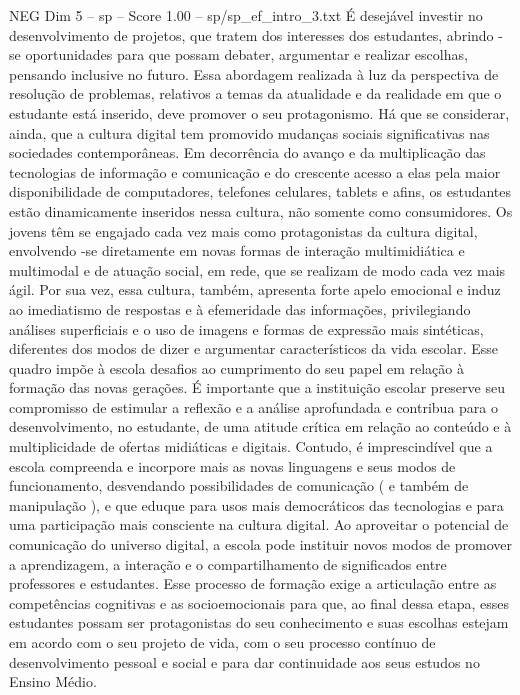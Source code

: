 \begin{textsample}{NEG Dim 5 – sp – Score 1.00 – sp/sp\_ef\_intro\_3.txt}
É desejável investir no desenvolvimento de projetos, que tratem dos interesses dos estudantes, abrindo -se oportunidades para que possam debater, argumentar e realizar escolhas, pensando inclusive no futuro.
Essa abordagem realizada à luz da perspectiva de resolução de problemas, relativos a temas da atualidade e da realidade em que o estudante está inserido, deve promover o seu protagonismo.
Há que se considerar, ainda, que a cultura digital tem promovido mudanças sociais significativas nas sociedades contemporâneas.
Em decorrência do avanço e da multiplicação das tecnologias de informação e comunicação e do crescente acesso a elas pela maior disponibilidade de computadores, telefones celulares, tablets e afins, os estudantes estão dinamicamente inseridos nessa cultura, não somente como consumidores.
Os jovens têm se engajado cada vez mais como protagonistas da cultura digital, envolvendo -se diretamente em novas formas de interação multimidiática e multimodal e de atuação social, em rede, que se realizam de modo cada vez mais ágil.
Por sua vez, essa cultura, também, apresenta forte apelo emocional e induz ao imediatismo de respostas e à efemeridade das informações, privilegiando análises superficiais e o uso de imagens e formas de expressão mais sintéticas, diferentes dos modos de dizer e argumentar característicos da vida escolar.
Esse quadro impõe à escola desafios ao cumprimento do seu papel em relação à formação das novas gerações.
É importante que a instituição escolar preserve seu compromisso de estimular a reflexão e a análise aprofundada e contribua para o desenvolvimento, no estudante, de uma atitude crítica em relação ao conteúdo e à multiplicidade de ofertas midiáticas e digitais.
Contudo, é imprescindível que a escola compreenda e incorpore mais as novas linguagens e seus modos de funcionamento, desvendando possibilidades de comunicação ( e também de manipulação ), e que eduque para usos mais democráticos das tecnologias e para uma participação mais consciente na cultura digital.
Ao aproveitar o potencial de comunicação do universo digital, a escola pode instituir novos modos de promover a aprendizagem, a interação e o compartilhamento de significados entre professores e estudantes.
Esse processo de formação exige a articulação entre as competências cognitivas e as socioemocionais para que, ao final dessa etapa, esses estudantes possam ser protagonistas do seu conhecimento e suas escolhas estejam em acordo com o seu projeto de vida, com o seu processo contínuo de desenvolvimento pessoal e social e para dar continuidade aos seus estudos no Ensino Médio.

\end{textsample}
